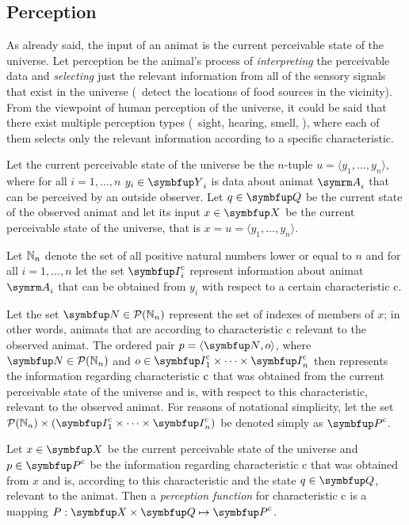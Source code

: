 \subsection{Perception}
As already said, the input of an animat is the current perceivable state of the universe. Let perception be the animal's process of \emph{interpreting} the perceivable data and \emph{selecting} just the relevant information from all of the sensory signals that exist in the universe (\eg\ detect the locations of food sources in the vicinity). From the viewpoint of human perception of the universe, it could be said that there exist multiple perception types (\ie\ sight, hearing, smell, \etc), where each of them selects only the relevant information according to a specific characteristic. 

Let the current perceivable state of the universe be the $n$-tuple  $u=\langle y_1,\ldots,y_n\rangle$, where for all $i=1,\ldots,n$ $y_i \in \set{Y}_i$ is data about animat $\autom{A}_i$ that can be perceived by an outside observer. Let $q \in \set{Q}$ be the current state of the observed animat and let its input $x \in \set{X}$ be the current perceivable state of the universe, that is  $x=u=\langle y_1,\ldots,y_n \rangle$. 

Let $\mathbb{N}_n$ denote the set of all positive natural numbers lower or equal to $n$ and for all $i=1,\ldots,n$ let the set $\set{I}^\textnormal{c}_i$ represent information about animat $\autom{A}_i$ that can be obtained from $y_i$ with respect to a certain characteristic $\mathrm{c}$. 

Let the set $\set{N} \in \powset{\N_n}$ represent the set of indexes of members of $x$; in other words, animats that are according to characteristic $\mathrm{c}$ relevant to the observed animat. The ordered pair $p=\langle\set{N},o\rangle$, where $\set{N} \in \powset{\N_n}$ and $o \in \set{I}^\textnormal{c}_1 \times \cdots \times \set{I}^\textnormal{c}_n$ then represents the information regarding characteristic $\textnormal{c}$ that was obtained from the current perceivable state of the universe and is, with respect to this characteristic, relevant to the observed animat. For reasons of notational simplicity, let the set $\powset{\N_n} \times (\set{I}^\textnormal{c}_1 \times \cdots \times \set{I}^\textnormal{c}_n)$ be denoted simply as $\set{P}^\textnormal{c}$. 

\begin{definition}
	\label{def:animat:Pi}
	Let $x \in \set{X}$ be the current perceivable state of the universe and $p \in \set{P}^\textnormal{c}$ be the information regarding characteristic $\mathrm{c}$ that was obtained from $x$ and is, according to this characteristic and the state $q \in \set{Q}$, relevant to the animat. Then a \emph{perception function} for characteristic $\mathrm{c}$ is a mapping $P: \set{X} \times \set{Q} \mapsto \set{P}^\textnormal{c}$.
\end{definition}

